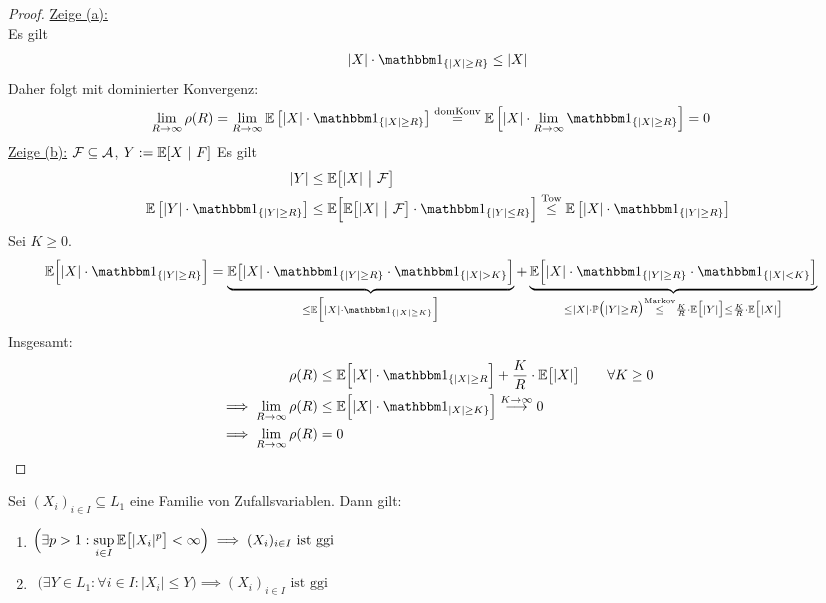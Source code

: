 \begin{proof}
	\underline{Zeige (a):}\\
	Es gilt
	\begin{align*}
		|X|\cdot\indi_{\lbrace|X|\geq R\rbrace}\leq |X|
	\end{align*}
	Daher folgt mit dominierter Konvergenz:
	\begin{align*}
		\lim\limits_{R\to\infty}\rho(R)
		&=\lim\limits_{R\to\infty}\E\left[|X|\cdot\indi_{\lbrace |X|\geq R\rbrace}\right]
		\stackeq{\text{domKonv}}\E\left[|X|\cdot\lim\limits_{R\to\infty}\indi_{\lbrace|X|\geq R\rbrace}\right]
		=0
	\end{align*}
	\underline{Zeige (b):} $\mathcal{F}\subseteq\mathcal{A}$, $Y:=\mathbb{E}[X~|~F]$ Es gilt
	\begin{align*}
		|Y|&\leq\E\big[|X|~\big|~\F\big]\\
		\E\left[|Y|\cdot\indi_{\lbrace|Y|\geq R\rbrace}\right]
		&\leq\E\Big[\E\big[|X|~\big|~\F\big]\cdot\indi_{\lbrace |Y|\leq R\rbrace}\Big]
		\stackrel{\text{Tow}}{\leq}
		\E\left[|X|\cdot\indi_{\lbrace|Y|\geq R\rbrace}\right]
	\end{align*}
	Sei $K\geq0$.
	\begin{align*}
		\E\Big[|X|\cdot\indi_{\lbrace|Y|\geq R\rbrace}\Big]
		&=\underbrace{\E\big[|X|\cdot\indi_{\lbrace |Y|\geq R\rbrace}\cdot\indi_{\lbrace |X|>K\rbrace}\Big]}_{\leq\E\Big[|X|\cdot\indi_{\lbrace |X|\geq K\rbrace}\Big]}+
		\underbrace{\E\Big[|X|\cdot\indi_{\lbrace|Y|\geq R\rbrace}\cdot\indi_{\lbrace|X|<K\rbrace}\Big]}_{\leq|X|\cdot\P\big(|Y|\geq R\big)\stackrel{\text{Markov}}{\leq}\frac{K}{R}\cdot\E\big[|Y|\big]\leq\frac{K}{R}\cdot\E\big[|X|\big]}
	\end{align*}
	Insgesamt:
	\begin{align*}
		\rho(R)
		&\leq\E\Big[|X|\cdot\indi_{\lbrace|X|\geq R}\Big]+\frac{K}{R}\cdot\E\big[|X|\big]\qquad\forall K\geq0\\
		\implies
		\lim\limits_{R\to\infty}\rho(R)
		&\leq\E\Big[|X|\cdot\indi_{|X|\geq K\rbrace}\Big]\stackrel{K\to\infty}{\longrightarrow}0\\
		\implies \lim\limits_{R\to\infty}\rho(R)&=0
	\end{align*}
\end{proof}

\begin{theorem}\label{theorem4.4HinreichendeBeingungenFuerggi}\enter
	Sei $(X_i)_{i\in I}\subseteq L_1$ eine Familie von Zufallsvariablen. Dann gilt:
	\begin{enumerate}[label=(\alph*)]
		\item $\begin{aligned}
			\Big(\exists p>1:\sup\limits_{i\in I}\mathbb{E}\big[|X_i|^p\big]<\infty\Big)\implies (X_i)_{i\in I}\text{ ist ggi}
		\end{aligned}$
		\item $\begin{aligned}
			\Big(\exists Y\in L_1:\forall i\in I:|X_i|\leq Y\Big)\implies(X_i)_{i\in I}\text{ ist ggi}
		\end{aligned}$
	\end{enumerate}
\end{theorem}


